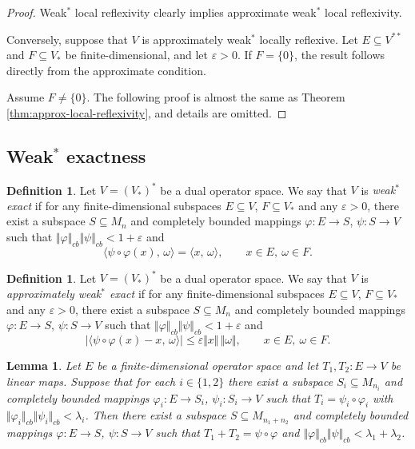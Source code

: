 \documentclass[12pt]{article}
\newtheorem{lemma}[theorem]{Lemma}
\theoremstyle{definition}
\newtheorem{definition}[theorem]{Definition}
\theoremstyle{remark}
\begin{document}
\begin{proof}
Weak$^{*}$ local reflexivity clearly implies approximate weak$^{*}$ local reflexivity.

Conversely, suppose that $V$ is
approximately weak$^{*}$ locally reflexive. Let $E\subseteq V^{**}$ and
$F\subseteq V_*$ be finite-dimensional, and let $\varepsilon>0$. If
$F=\{0\}$, the result follows directly from the approximate condition.

Assume $F\ne\{0\}$. The following proof is almost the same as Theorem \ref{thm:approx-local-reflexivity}, and details are omitted.

\end{proof}

\subsection{Weak$^{*}$ exactness}

\begin{definition}\label{def:weak-star}
Let $V=(V_*)^*$ be a dual operator space. We say that $V$ is
\emph{weak$^{*}$ exact} if for any finite-dimensional subspaces
$E\subseteq V$, $F\subseteq V_*$ and any $\varepsilon>0$, there exist
a subspace $S\subseteq M_n$ and completely bounded mappings
$\varphi:E\to S$, $\psi:S\to V$ such that
$\Vert\varphi\Vert_{cb}\Vert\psi\Vert_{cb}<1+\varepsilon$ and
\[
\langle\psi\circ\varphi(x),\,\omega\rangle=\langle x,\,\omega\rangle,
\qquad x\in E,\ \omega\in F.
\]
\end{definition}

\begin{definition}\label{def:approx-weak-star}
Let $V=(V_*)^*$ be a dual operator space. We say that $V$ is
\emph{approximately weak$^{*}$ exact} if for any finite-dimensional
subspaces $E\subseteq V$, $F\subseteq V_*$ and any $\varepsilon>0$,
there exist a subspace $S\subseteq M_n$ and completely bounded
mappings $\varphi:E\to S$, $\psi:S\to V$ such that
$\Vert\varphi\Vert_{cb}\Vert\psi\Vert_{cb}<1+\varepsilon$ and
\[
|\langle\psi\circ\varphi(x)-x,\,\omega\rangle|
\le\varepsilon\Vert x\Vert\,\Vert\omega\Vert,
\qquad x\in E,\ \omega\in F.
\]
\end{definition}




\begin{lemma}\label{lem:sum-ex}
Let $E$ be a finite-dimensional operator space and let $T_1,T_2:E\to V$
be linear maps. Suppose that for each $i\in\{1,2\}$ there
exist a subspace $S_i\subseteq M_{n_i}$ and completely bounded mappings
$\varphi_i:E\to S_i$, $\psi_i:S_i\to V$ such that
$T_i=\psi_i\circ\varphi_i$ with
$\Vert\varphi_i\Vert_{cb}\Vert\psi_i\Vert_{cb}<\lambda_i$. Then there
exist a subspace $S\subseteq M_{n_1+n_2}$ and completely bounded
mappings $\varphi:E\to S$, $\psi:S\to V$ such that
$T_1+T_2=\psi\circ\varphi$ and
$\Vert\varphi\Vert_{cb}\Vert\psi\Vert_{cb}<\lambda_1+\lambda_2$.
\end{lemma}
\end{document}
